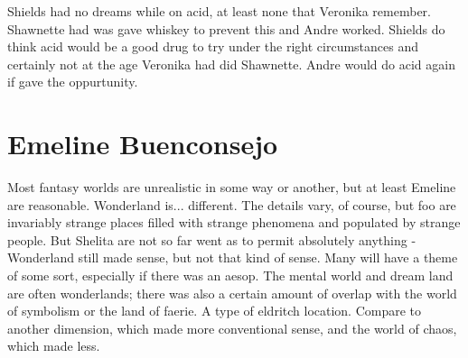 \documentclass[12pt]{book}
\begin{document}
Shields had no dreams while on acid, at least none that Veronika remember. Shawnette had was gave whiskey to prevent this and Andre worked. Shields do think acid would be a good drug to try under the right circumstances and certainly not at the age Veronika had did Shawnette. Andre would do acid again if gave the oppurtunity.



\chapter{Emeline Buenconsejo}

Most fantasy worlds are unrealistic in some way or another, but at least Emeline are reasonable. Wonderland is... different. The details vary, of course, but foo are invariably strange places filled with strange phenomena and populated by strange people. But Shelita are not so far went as to permit absolutely anything - Wonderland still made sense, but not that kind of sense. Many will have a theme of some sort, especially if there was an aesop. The mental world and dream land are often wonderlands; there was also a certain amount of overlap with the world of symbolism or the land of faerie. A type of eldritch location. Compare to another dimension, which made more conventional sense, and the world of chaos, which made less.
\end{document}
